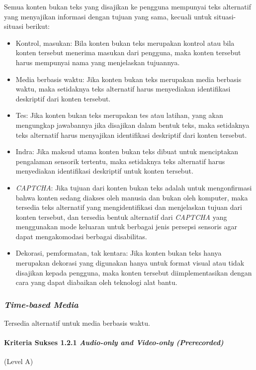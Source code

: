 Semua konten bukan teks yang disajikan ke pengguna mempunyai teks alternatif yang menyajikan informasi dengan tujuan yang sama, kecuali untuk situasi-situasi berikut:
\begin{itemize}
	\item Kontrol, masukan: Bila konten bukan teks merupakan kontrol atau bila konten tersebut menerima masukan dari pengguna, maka konten tersebut harus mempunyai nama yang menjelaskan tujuannya.
	\item Media berbasis waktu: Jika konten bukan teks merupakan media berbasis waktu, maka setidaknya teks alternatif harus menyediakan identifikasi deskriptif dari konten tersebut.
	\item Tes: Jika konten bukan teks merupakan tes atau latihan, yang akan mengungkap jawabannya jika disajikan dalam bentuk teks, maka setidaknya teks alternatif harus menyajikan identifikasi deskriptif dari konten tersebut.
	\item Indra: Jika maksud utama konten bukan teks dibuat untuk menciptakan pengalaman sensorik tertentu, maka setidaknya teks alternatif harus menyediakan identifikasi deskriptif untuk konten tersebut.
	\item \textit{CAPTCHA}: Jika tujuan dari konten bukan teks adalah untuk mengonfirmasi bahwa konten sedang diakses oleh manusia dan bukan oleh komputer, maka tersedia teks alternatif yang mengidentifikasi dan menjelaskan tujuan dari konten tersebut, dan tersedia bentuk alternatif dari \textit{CAPTCHA} yang menggunakan mode keluaran untuk berbagai jenis persepsi sensoris agar dapat mengakomodasi berbagai disabilitas.
	\item Dekorasi, pemformatan, tak kentara: Jika konten bukan teks hanya merupakan dekorasi yang digunakan hanya untuk format visual atau tidak disajikan kepada pengguna, maka konten tersebut diimplementasikan dengan cara yang dapat diabaikan oleh teknologi alat bantu.
\end{itemize}

\subsubsection{\textit{Time-based Media}}
\label{sec:time_based_media}
Tersedia alternatif untuk media berbasis waktu.

\paragraph{Kriteria Sukses 1.2.1 \textit{Audio-only and Video-only (Prerecorded)}}
\label{sec:kriteria_sukses_1.2.1}
(Level A)\\


